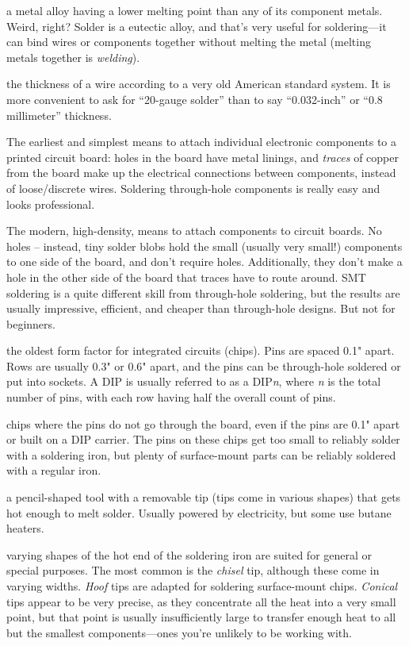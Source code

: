 \documentclass[12pt]{article}
\begin{document}
\begin{description}
\+[Eutectic:] a metal alloy having a lower melting point than any of its component metals. Weird, right? Solder is a eutectic alloy, and that's very useful for soldering---it can bind wires or components together without melting the metal (melting metals together is \emph{welding}).

\+[Gauge:] the thickness of a wire according to a very old American standard system. It is more convenient to ask for ``20-gauge solder'' than to say ``0.032-inch'' or ``0.8 millimeter'' thickness.

 The earliest and simplest means to attach individual electronic components to a printed circuit board: holes in the board have metal linings, and \emph{traces} of copper from the board make up the electrical connections between components, instead of loose/discrete wires. Soldering through-hole components is really easy and looks professional.

 The modern, high-density, means to attach components to circuit boards. No holes -- instead, tiny solder blobs hold the small (usually very small!) components to one side of the board, and don't require holes. Additionally, they don't make a hole in the other side of the board that traces have to route around. SMT soldering is a quite different skill from through-hole soldering, but the results are usually impressive, efficient, and cheaper than through-hole designs. But not for beginners.

 the oldest form factor for integrated circuits (chips). Pins are spaced 0.1" apart. Rows are usually 0.3" or 0.6" apart, and the pins can be through-hole soldered or put into sockets. A DIP is usually referred to as a DIP\emph{n}, where \emph{n} is the total number of pins, with each row having half the overall count of pins. 

 chips where the pins do not go through the board, even if the pins are 0.1" apart or built on a DIP carrier. The pins on these chips get too small to reliably solder with a soldering iron, but plenty of surface-mount parts can be reliably soldered with a regular iron.

 a pencil-shaped tool with a removable tip (tips come in various shapes) that gets hot enough to melt solder. Usually powered by electricity, but some use butane heaters.

 varying shapes of the hot end of the soldering iron are suited for general or special purposes. The most common is the \emph{chisel} tip, although these come in varying widths. \emph{Hoof} tips are adapted for soldering surface-mount chips. \emph{Conical} tips appear to be very precise, as they concentrate all the heat into a very small point, but that point is usually insufficiently large to transfer enough heat to all but the smallest components---ones you're unlikely to be working with.


\end{description}
\end{document}
